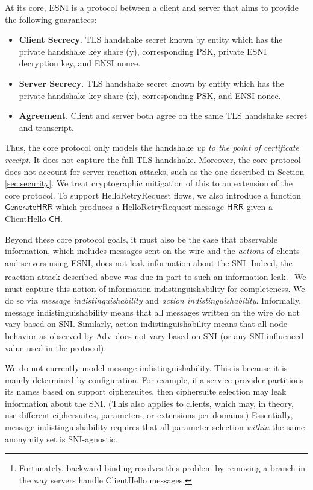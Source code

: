 \documentclass{article}
\theoremstyle{definition}
\newcommand{\adv}{{\sf Adv}}
\theoremstyle{definition}
\begin{document}

At its core, ESNI is a protocol between a client and server that aims to provide the following guarantees:

%
\begin{itemize}
  \item {\bf Client Secrecy}. TLS handshake secret known by entity which has the private handshake key 
  share (y), corresponding PSK, private ESNI decryption key, and ENSI nonce. 
  \item {\bf Server Secrecy}. TLS handshake secret known by entity which has the private handshake key 
  share (x), corresponding PSK, and ENSI nonce.
  \item {\bf Agreement}. Client and server both agree on the same TLS handshake secret and transcript.
\end{itemize}
%

Thus, the core protocol only models the handshake \emph{up to the point of certificate receipt}. It does
not capture the full TLS handshake. Moreover, the core protocol does not account for server reaction
attacks, such as the one described in Section \ref{sec:security}. We treat cryptographic mitigation
of this to an extension of the core protocol. To support HelloRetryRequest flows, we also introduce a 
function $\mathsf{GenerateHRR}$ which produces a HelloRetryRequest message $\mathsf{HRR}$ given a 
ClientHello $\mathsf{CH}$.

Beyond these core protocol goals, it must also be the case that observable information, which includes 
messages sent on the wire and the \emph{actions} of clients and servers using ESNI, does not leak information
about the SNI. Indeed, the reaction attack described above was due in part to such an information 
leak.\footnote{Fortunately, backward binding resolves this problem by removing a branch in the way servers
handle ClientHello messages.} We must capture this notion of information indistinguishability for completeness.
We do so via \emph{message indistinguishability} and \emph{action indistinguishability}. Informally, message 
indistinguishability means that all messages written on the wire do not vary based on SNI. Similarly, action
indistinguishability means that all node behavior as observed by \adv\ does not vary based on SNI (or any SNI-influenced
value used in the protocol). 

We do not currently model message indistinguishability. This is because it is mainly determined by configuration.
For example, if a service provider partitions its names based on support ciphersuites, then ciphersuite
selection may leak information about the SNI. (This also applies to clients, which may, in theory, use different
ciphersuites, parameters, or extensions per domains.) Essentially, message indistinguishability requires that
all parameter selection \emph{within} the same anonymity set is SNI-agnostic.
\end{document}
